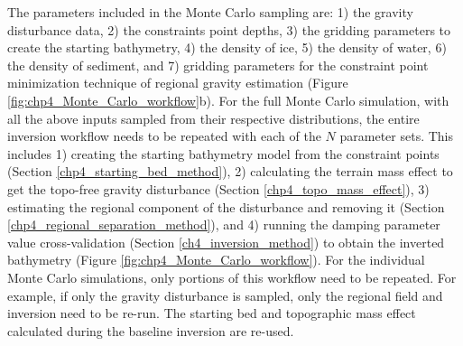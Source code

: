 The parameters included in the Monte Carlo sampling are: 1) the gravity disturbance data, 2) the constraints point depths, 3) the gridding parameters to create the starting bathymetry, 4) the density of ice, 5) the density of water, 6) the density of sediment, and 7) gridding parameters for the constraint point minimization technique of regional gravity estimation (Figure \ref{fig:chp4_Monte_Carlo_workflow}b). For the full Monte Carlo simulation, with all the above inputs sampled from their respective distributions, the entire inversion workflow needs to be repeated with each of the $N$ parameter sets. This includes 1) creating the starting bathymetry model from the constraint points (Section \ref{chp4_starting_bed_method}), 2) calculating the terrain mass effect to get the topo-free gravity disturbance (Section \ref{chp4_topo_mass_effect}), 3) estimating the regional component of the disturbance and removing it (Section \ref{chp4_regional_separation_method}), and 4) running the damping parameter value cross-validation (Section \ref{ch4_inversion_method}) to obtain the inverted bathymetry (Figure \ref{fig:chp4_Monte_Carlo_workflow}). For the individual Monte Carlo simulations, only portions of this workflow need to be repeated. For example, if only the gravity disturbance is sampled, only the regional field and inversion need to be re-run. The starting bed and topographic mass effect calculated during the baseline inversion are re-used. \\

